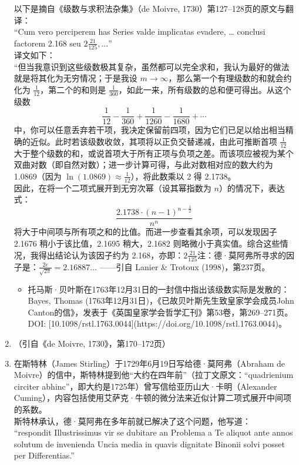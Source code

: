 \begin{enumerate}
以下是摘自《级数与求积法杂集》（de Moivre, 1730）第127–128页的原文与翻译：\\
“Cum vero perciperem has Series valde implicatas evadere, … conclusi factorem 2.168 seu $\displaystyle 2\frac{21}{125},\ldots$”\\
译文如下：\\
“但当我意识到这些级数极其复杂，虽然都可以完全求和，我认为最好的做法就是将其化为无穷情况；于是我设 $m \to \infty$，那么第一个有理级数的和就会约化为 $\frac{1}{12}$，第二个的和则是 $\frac{1}{360}$，如此一来，所有级数的总和便可得出。从这个级数
$$
\frac{1}{12} - \frac{1}{360} + \frac{1}{1260} - \frac{1}{1680} + \cdots~
$$
中，你可以任意丢弃若干项，我决定保留前四项，因为它们已足以给出相当精确的近似。此时若该级数收敛，其项将以正负交替递减，由此可推断首项 $\frac{1}{12}$ 大于整个级数的和，或说首项大于所有正项与负项之差。而该项应被视为某个双曲对数（即自然对数）；进一步计算可得，与此对数相对应的数大约为 1.0869（因为 $\ln(1.0869) \approx \frac{1}{12}$），将此数乘以 2 得 2.1738。\\
因此，在将一个二项式展开到无穷次幂（设其幂指数为 $n$）的情况下，表达式：
$$
\frac{2.1738 \cdot (n-1)^{n - \frac{1}{2}}}{n^n}~
$$
将大于中间项与所有项之和的比值。而进一步查看其余项，可以发现因子 2.1676 稍小于该比值，2.1695 稍大，2.1682 则略微小于真实值。综合这些情况，我得出结论认为该因子约为 2.168，亦即：$\displaystyle 2\frac{21}{125}$注：德·莫阿弗所寻求的因子是：$\frac{2e}{\sqrt{2\pi}} = 2.16887\ldots$
——引自 Lanier & Trotoux (1998)，第237页。
\begin{itemize}
\item 托马斯·贝叶斯在1763年12月31日的一封信中指出该级数实际是发散的：Bayes, Thomas (1763年12月31日)，《已故贝叶斯先生致皇家学会成员John Canton的信》，发表于《英国皇家学会哲学汇刊》第53卷，第269–271页。DOI: [10.1098/rstl.1763.0044](https://doi.org/10.1098/rstl.1763.0044)。
\end{itemize}
\item （引自《de Moivre, 1730》，第170–172页）
\item 在斯特林（James Stirling）于1729年6月19日写给德·莫阿弗（Abraham de Moivre）的信中，斯特林提到他“大约在四年前”（拉丁文原文：“quadrienium circiter abhinc”，即大约是1725年）曾写信给亚历山大·卡明（Alexander Cuming），内容包括使用艾萨克·牛顿的微分法来近似计算二项式展开中间项的系数。\\
斯特林承认，德·莫阿弗在多年前就已解决了这个问题，他写道：\\
“respondit Illustrissimus vir se dubitare an Problema a Te aliquot ante annos solutum de invenienda Uncia media in quavis dignitate Binonii solvi posset per Differentias.”\\

\end{enumerate}
